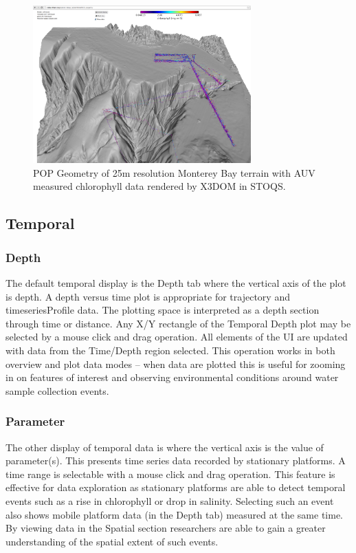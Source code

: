 \documentclass[conference]{IEEEtran}
\begin{document}
\begin{figure}[htbp]
\centering
\includegraphics[width=3.3in]{Monterey25_lrauvs.png}
\caption{POP Geometry of 25m resolution Monterey Bay terrain with AUV measured chlorophyll data rendered by X3DOM in STOQS.}
\label{fig:Monterey25_lrauvs}
\end{figure}


\subsection{Temporal}

\subsubsection{Depth}
The default temporal display is the Depth tab where the vertical axis of the plot is depth. A depth versus time plot is appropriate for trajectory and timeseriesProfile data. The plotting space is interpreted as a depth section through time or distance. Any X/Y rectangle of the Temporal Depth plot may be selected by a mouse click and drag operation. All elements of the UI are updated with data from the Time/Depth region selected. This operation works in both overview and plot data modes -- when data are plotted this is useful for zooming in on features of interest and observing environmental conditions around water sample collection events.

\subsubsection{Parameter}
The other display of temporal data is where the vertical axis is the value of parameter(s). This presents time series data recorded by stationary platforms. A time range is selectable with a mouse click and drag operation. This feature is effective for data exploration as stationary platforms are able to detect temporal events such as a rise in chlorophyll or drop in salinity. Selecting such an event also shows mobile platform data (in the Depth tab) measured at the same time. By viewing data in the Spatial section researchers are able to gain a greater understanding of the spatial extent of such events.
\end{document}
